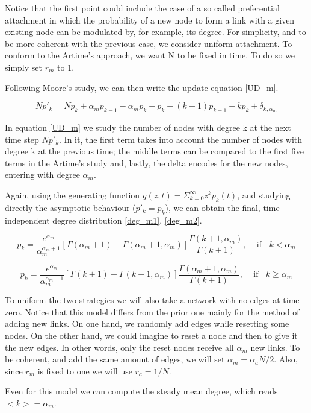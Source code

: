 Notice that the first point could include the case of a so called preferential attachment in which the probability of a new node to form a link with a given existing node can be modulated by, for example, its degree. For simplicity, and to be more coherent with the previous case, we consider uniform attachment. To conform to the Artime's approach, we want N to be fixed in time. To do so we simply set $r_m$ to 1. 

Following Moore's study, we can then write the update equation \eqref{UD_m}.

\begin{equation}
N p'_k = N p_k + \alpha_m p_{k-1} - \alpha_m p_k - p_k + (k+1)p_{k+1} - kp_k + \delta_{k,\alpha_m}  \label{UD_m}
\end{equation}

In equation \eqref{UD_m} we study the number of nodes with degree k at the next time step $Np'_k$. In it, the first term takes into account the number of nodes with degree k at the previous time; the middle terms can be compared to the first five terms in the Artime's study and, lastly, the delta encodes for the new nodes, entering with degree $\alpha_m$.

Again, using the generating function $g(z,t)=\Sigma_{k=0}^{\infty}z^k p_k (t)$, and studying directly the asymptotic behaviour ($p'_k=p_k$), we can obtain the final, time independent degree distribution \eqref{deg_m1}, \eqref{deg_m2}.

\begin{equation}
p_k = \frac{e^{\alpha_m}}{\alpha_m^{\alpha_m+1}}[\Gamma(\alpha_m+1) - \Gamma(\alpha_m+1,\alpha_m)]\frac{\Gamma(k+1,\alpha_m)}{\Gamma(k+1)}, \;\;\;\text{ if }\;\; k<\alpha_m\label{deg_m1}
\end{equation}

\begin{equation}
p_k = \frac{e^{\alpha_m}}{\alpha_m^{\alpha_m+1}}[\Gamma(k+1) - \Gamma(k+1,\alpha_m)]\frac{\Gamma(\alpha_m+1,\alpha_m)}{\Gamma(k+1)}, \;\;\;\text{ if }\;\; k\geq \alpha_m\label{deg_m2}
\end{equation}

To uniform the two strategies we will also take a network with no edges at time zero. Notice that this model differs from the prior one mainly for the method of adding new links. On one hand, we randomly add edges while resetting some nodes. On the other hand, we could imagine to reset a node and then to give it the new edges. In other words, only the reset nodes receive all $\alpha_m$ new links. To be coherent, and add the same amount of edges, we will set $\alpha_m = \alpha_a N/2$. Also, since $r_m$ is fixed to one we will use $r_a=1/N$.

Even for this model we can compute the steady mean degree, which reads $\;\;$ $<k>=\alpha_m$.

\newpage
